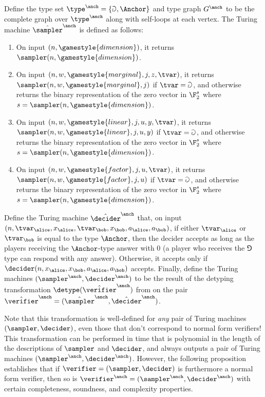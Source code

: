 Define the type set $\type^\anch = \{\Game, \Anchor\}$ and type graph
$G^\anch$ to be the complete graph over $\type^\anch$ along with self-loops at
each vertex. The Turing machine $\tsanch$ is defined as follows:
\begin{enumerate}
	\item On input $(n,\gamestyle{dimension})$, it returns $\sampler(n,\gamestyle{dimension})$.
	\item On input $(n,w,\gamestyle{marginal},j,z,\tvar)$, it returns $\sampler(n,w,\gamestyle{marginal},j)$ if $\tvar = \Game$, and otherwise returns the binary representation of the zero vector in $\F_2^s$ where $s = \sampler(n,\gamestyle{dimension})$.
	\item On input $(n,w,\gamestyle{linear},j,u,y,\tvar)$, it returns $\sampler(n,w,\gamestyle{linear},j,u,y)$ if $\tvar = \Game$, and otherwise returns the binary representation of the zero vector in $\F_2^s$ where $s = \sampler(n,\gamestyle{dimension})$.
	\item On input $(n,w,\gamestyle{factor},j,u,\tvar)$, it returns $\sampler(n,w,\gamestyle{factor},j,u)$ if $\tvar = \Game$, and otherwise returns the binary representation of the zero vector in $\F_2^s$ where $s = \sampler(n,\gamestyle{dimension})$.
\end{enumerate}
Define the Turing machine $\tdanch$ that, on input
$(n,\tvar_\alice,x_\alice,\tvar_\bob,x_\bob,a_\alice,a_\bob)$, if either
$\tvar_\alice$ or $\tvar_\bob$ is equal to the type $\Anchor$, then the decider
accepts as long as the players receiving the $\Anchor$-type answer with $0$ (a player who receives the $\Game$ type can respond with any answer). 
Otherwise, it accepts only if $\decider(n,x_\alice,x_\bob,a_\alice,a_\bob)$
accepts. Finally, define the Turing machines $(\sanch,\danch)$ to be the result of the detyping transformation $\detype(\tvanch)$ from  on the pair $\tvanch = (\tsanch,\tdanch)$. 

Note that this transformation is well-defined for \emph{any} pair of Turing machines $(\sampler,\decider)$, even those that don't correspond to normal form verifiers! This transformation can be performed in time that is polynomial in the length of the descriptions of $\sampler$ and $\decider$, and always outputs a pair of Turing machines $(\sanch,\danch)$. However, the following proposition establishes that if $\verifier = (\sampler,\decider)$ is furthermore a normal form verifier, then so is $\vanch = (\sanch,\danch)$ with certain completeness, soundness, and complexity properties.






